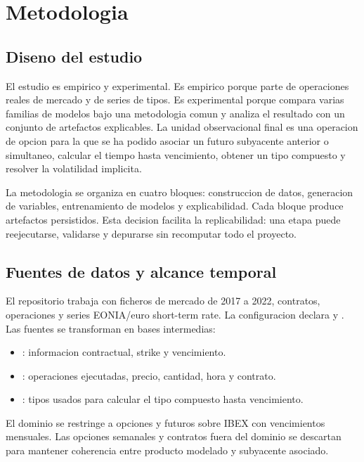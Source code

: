 \chapter{Metodologia}
\label{chap:metodologia}

\section{Diseno del estudio}

El estudio es empirico y experimental. Es empirico porque parte de operaciones reales de mercado y de series de tipos. Es experimental porque compara varias familias de modelos bajo una metodologia comun y analiza el resultado con un conjunto de artefactos explicables. La unidad observacional final es una operacion de opcion para la que se ha podido asociar un futuro subyacente anterior o simultaneo, calcular el tiempo hasta vencimiento, obtener un tipo compuesto y resolver la volatilidad implicita.

La metodologia se organiza en cuatro bloques: construccion de datos, generacion de variables, entrenamiento de modelos y explicabilidad. Cada bloque produce artefactos persistidos. Esta decision facilita la replicabilidad: una etapa puede reejecutarse, validarse y depurarse sin recomputar todo el proyecto.

\section{Fuentes de datos y alcance temporal}

El repositorio trabaja con ficheros de mercado de 2017 a 2022, contratos, operaciones y series EONIA/euro short-term rate. La configuracion declara  y . Las fuentes se transforman en bases intermedias:

\begin{itemize}
  \item {}: informacion contractual, strike y vencimiento.
  \item {}: operaciones ejecutadas, precio, cantidad, hora y contrato.
  \item {}: tipos usados para calcular el tipo compuesto hasta vencimiento.
\end{itemize}

El dominio se restringe a opciones y futuros sobre IBEX con vencimientos mensuales. Las opciones semanales y contratos fuera del dominio se descartan para mantener coherencia entre producto modelado y subyacente asociado.

